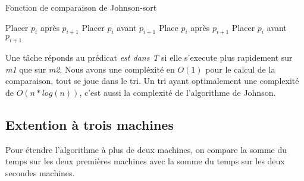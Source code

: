 \begin{algorithm}
\caption{Fonction de comparaison de Johnson-sort}
\begin{algorithmic}
		\STATE {}
		\STATE Placer $p_i$ après $p_{i+1}$
	\ELSE
		\STATE {}
		\STATE Placer $p_i$ avant $p_{i+1}$
	\ENDIF
\ELSE
		\STATE {}
		\STATE Place $p_i$ après $p_{i+1}$
	\ELSE
		\STATE {}
		\STATE Placer $p_i$ avant $p_{i+1}$ 
	\ENDIF
\ENDIF
\end{algorithmic}
\end{algorithm}

Une tâche réponds au prédicat {\em est dans T} si elle s'execute plus rapidement
sur {\em m1} que sur {\em m2}.
Nous avons une compléxité en $O(1)$ pour le calcul de la comparaison, tout se joue
dans le tri. Un tri ayant optimalement une complexité de $O(n*log(n))$, c'est
aussi la complexité de l'algorithme de Johnson.

\subsection{Extention à trois machines}
Pour étendre l'algorithme à plus de deux machines, on compare la somme du temps
sur les deux premières machines avec la somme du temps sur les deux secondes
machines.
